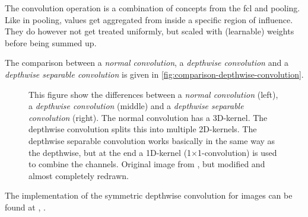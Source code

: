 The convolution operation is a combination of concepts from the fcl and pooling.
Like in pooling, values get aggregated from inside a specific region of influence.
They do however not get treated uniformly, but scaled with (learnable) weights before being summed up.

The comparison between a \emph{normal convolution}, a \emph{depthwise convolution} and a \emph{depthwise separable convolution} is given in \autoref{fig:comparison-depthwise-convolution}.

\begin{figure}[htbp]
    \centering
    \caption{This figure show the differences between a \emph{normal convolution} (left), a \emph{depthwise convolution}  (middle) and a \emph{depthwise separable convolution} (right).
    The normal convolution has a 3D-kernel. The depthwise convolution splits this into multiple 2D-kernels.
    The depthwise separable convolution works basically in the same way as the depthwise, but at the end a 1D-kernel (1$\times$1-convolution) is used to combine the channels.
     Original image from \cite{separableConvolutions}, but modified and almost completely redrawn.}
    \label{fig:comparison-depthwise-convolution}
\end{figure}



The implementation of the symmetric depthwise convolution for images can be found at \cite{selfComputerScience}, .







